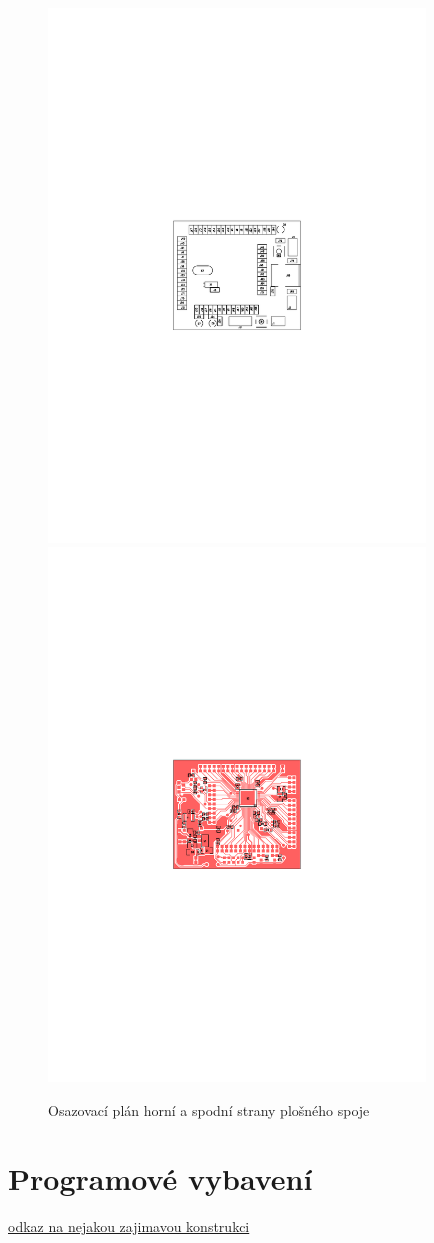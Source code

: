 \documentclass[12pt,a4paper,oneside]{article}
\begin{document}
\begin{figure} [h!tbp]
  \centering
  \includegraphics[trim = 6.5cm 11.5cm 6.5cm 11.5cm, clip, width=10cm]{../../CAM_DOC/O1.pdf}
  \includegraphics[trim = 6.5cm 11.5cm 6.5cm 11.5cm, clip, width=10cm]{../../CAM_DOC/O2.pdf}
  \caption{Osazovací plán horní a spodní strany plošného spoje}
  \label{fig:osazovaci_plan}
\end{figure}



\section{Programové vybavení}


\begin{thebibliography}{99}
\href{http:// odkaz na nejakou zajimavou konstrukci}{odkaz na nejakou zajimavou konstrukci}

\end{thebibliography}
\end{document}
